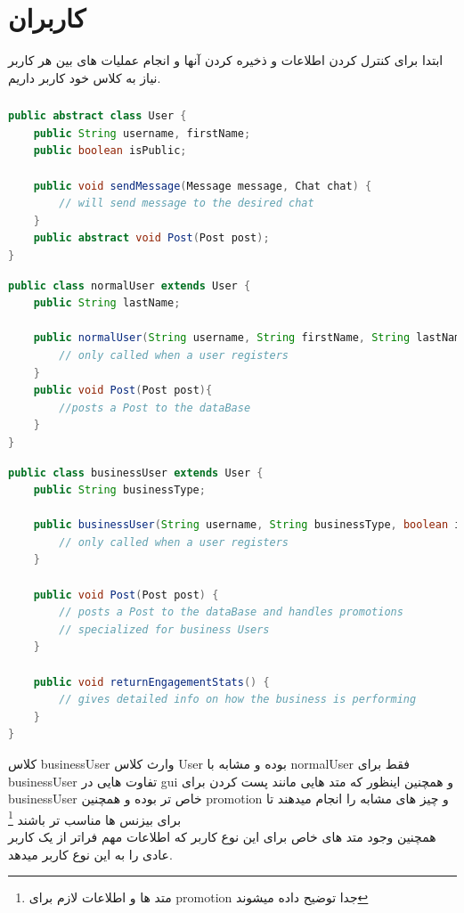 \documentclass[12pt]{article}
\begin{document}

\tableofcontents
\pagebreak
\section{کاربران}
ابتدا برای کنترل کردن اطلاعات و ذخیره کردن آنها و انجام عملیات های بین هر کاربر نیاز به کلاس خود کاربر داریم.\\
\begin{latin}
    \subsubsection*{}
    \begin{lstlisting}[language=Java, caption={abstract User class},label={lst:code}, mathescape=true, breaklines=true]
public abstract class User {
    public String username, firstName;
    public boolean isPublic;

    public void sendMessage(Message message, Chat chat) {
        // will send message to the desired chat
    }
    public abstract void Post(Post post);
}        
    \end{lstlisting}
    \begin{lstlisting}[language=Java, caption={normalUser class},label={lst:code}, mathescape=true, breaklines=true]
public class normalUser extends User {
    public String lastName;

    public normalUser(String username, String firstName, String lastName, boolean isPublic) {
        // only called when a user registers
    }
    public void Post(Post post){
        //posts a Post to the dataBase
    }
}
    \end{lstlisting}
    \begin{lstlisting}[language=Java, caption={businessUser class},label={lst:code}, mathescape=true, breaklines=true]
public class businessUser extends User {
    public String businessType;

    public businessUser(String username, String businessType, boolean isPublic) {
        // only called when a user registers
    }

    public void Post(Post post) {
        // posts a Post to the dataBase and handles promotions
        // specialized for business Users
    }

    public void returnEngagementStats() {
        // gives detailed info on how the business is performing
    }
}
    \end{lstlisting}
\end{latin}
کلاس businessUser وارث کلاس User بوده و مشابه با normalUser
فقط برای businessUser تفاوت هایی در gui و همچنین
اینظور که متد هایی مانند پست کردن برای businessUser خاص تر
بوده و همچنین promotion و چیز های مشابه را انجام میدهند
تا برای بیزنس ها مناسب تر باشند
\footnote{متد ها و اطلاعات لازم برای promotion جدا توضیح داده میشوند}\\
همچنین وجود متد های خاص برای این نوع کاربر که اطلاعات مهم فراتر از یک
کاربر عادی را به این نوع کاربر میدهد.
\pagebreak
\end{document}
